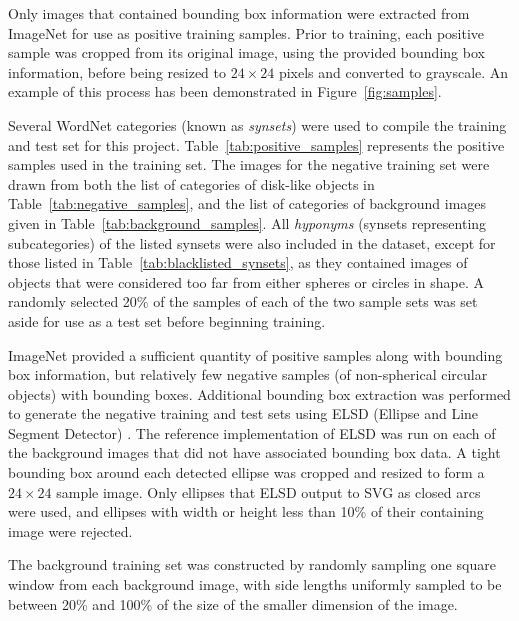 \documentclass{sig-alternate-05-2015}
\newcommand{\newterm}[1]{{\textit{#1}}}
\newcommand{\citep}[1]{\cite{#1}}
\begin{document}
{{			Only images that contained bounding box information were extracted from ImageNet for use as positive training samples. Prior to training, each positive sample was cropped from its original image, using the provided bounding box information, before being	resized to \(24\times24\) pixels and converted to grayscale. An example of this process has been demonstrated in Figure~\ref{fig:samples}.

			
			Several WordNet categories (known as \newterm{synsets}) were used to compile the training and test set for this project. Table~\ref{tab:positive_samples} represents the positive samples used in the training set. The images for the negative training set were drawn from both the list of categories of disk-like objects in Table~\ref{tab:negative_samples}, and the list of categories of background images given in Table~\ref{tab:background_samples}.
      All \newterm{hyponyms} (synsets representing subcategories) of the listed synsets were also included in the dataset, except for those listed in Table~\ref{tab:blacklisted_synsets}, as they contained images of objects that were considered too far from either spheres or circles in shape.
      A randomly selected 20\% of the samples of each of the two sample sets was set aside for use as a test set before beginning training.

      ImageNet provided a sufficient quantity of positive samples along with bounding box information, but relatively few negative samples (of non-spherical circular objects) with bounding boxes. Additional bounding box extraction was performed to generate the negative training and test sets using ELSD (Ellipse and Line Segment Detector) \citep{Patraucean:2012jf}. The reference implementation of ELSD was run on each of the background images that did not have associated bounding box data. A tight bounding box around each detected ellipse was cropped and resized to form a \(24\times24\) sample image. Only ellipses that ELSD output to SVG as closed arcs were used, and ellipses with width or height less than 10\% of their containing image were rejected.

      The background training set was constructed by randomly sampling one square window from each background image, with side lengths uniformly sampled to be between 20\% and 100\% of the size of the smaller dimension of the image.

}}
\end{document}
